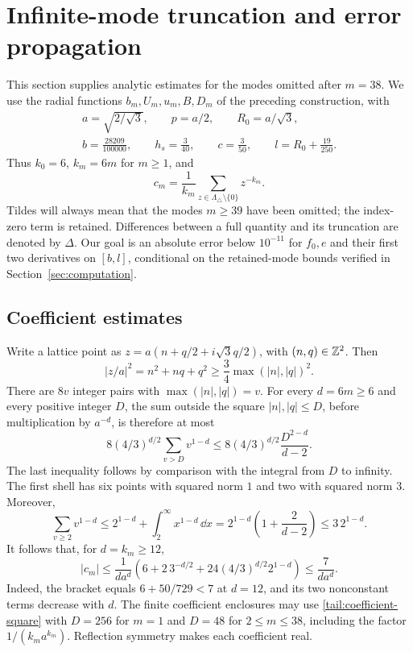 \section{Infinite-mode truncation and error propagation}
\label{tail:section}\label{sec:tails}

This section supplies analytic estimates for the modes omitted after
$m=38$.  We use the radial functions $b_m,U_m,u_m,B,D_m$ of the preceding
construction, with
\[
 \begin{gathered}
 a=\sqrt{2/\sqrt3},\qquad p=a/2,\qquad R_0=a/\sqrt3,\\
 b=\frac{28209}{100000},\qquad h_s=\frac{3}{40},\qquad
 c=\frac{3}{50},\qquad l=R_0+\frac{19}{250}.
 \end{gathered}
\]
Thus $k_0=6$, $k_m=6m$ for $m\geq1$, and
\[
 c_m=\frac1{k_m}\sum_{z\in\Lambda_\triangle\setminus\{0\}}z^{-k_m}.
\]
Tildes will always mean that the modes $m\geq39$ have been omitted;
the index-zero term is retained.  Differences between a full quantity
and its truncation are denoted by $\Delta$.
Our goal is an absolute error below $10^{-11}$ for $f_0,e$ and their
first two derivatives on $[b,l]$, conditional on the retained-mode
bounds verified in Section~\ref{sec:computation}.

\subsection{Coefficient estimates}
\label{tail:coefficients}

Write a lattice point as
$z=a(n+q/2+i\sqrt3 q/2)$, with $(n,q)\in\mathbb Z^2$.  Then
\[
 |z/a|^2=n^2+nq+q^2\geq\frac34\max(|n|,|q|)^2.
\]
There are $8v$ integer pairs with $\max(|n|,|q|)=v$.  For every
$d=6m\geq6$ and every positive integer $D$, the sum outside the square
$|n|,|q|\leq D$, before multiplication by $a^{-d}$, is therefore at most
\begin{equation}
 8(4/3)^{d/2}\sum_{v>D}v^{1-d}
 \leq 8(4/3)^{d/2}\frac{D^{2-d}}{d-2}.
 \label{tail:coefficient-square}
\end{equation}
The last inequality follows by comparison with the integral from $D$
to infinity.  The first shell has six points with squared norm $1$
and two with squared norm $3$.  Moreover,
\[
 \sum_{v\geq2}v^{1-d}
 \leq 2^{1-d}+\int_2^\infty x^{1-d}\,\dd x
 =2^{1-d}\left(1+\frac2{d-2}\right)
 \leq3\,2^{1-d}.
\]
It follows that, for $d=k_m\geq12$,
\begin{equation}
 |c_m|\leq\frac{1}{d a^d}
 \left(6+2\,3^{-d/2}+24(4/3)^{d/2}2^{1-d}\right)
 \leq\frac7{d a^d}.
 \label{tail:coefficient-uniform}
\end{equation}
Indeed, the bracket equals $6+50/729<7$ at $d=12$, and its two
nonconstant terms decrease with $d$.  The finite coefficient
enclosures may use \eqref{tail:coefficient-square} with $D=256$ for
$m=1$ and $D=48$ for $2\leq m\leq38$, including the factor
$1/(k_m a^{k_m})$.  Reflection symmetry makes each coefficient real.

